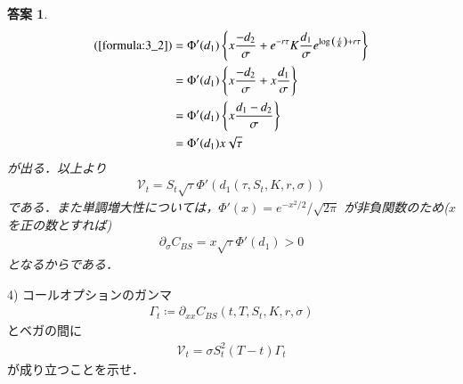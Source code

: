 \documentclass[11pt,a4paper]{jsarticle}
\theoremstyle{mystyle}
\newtheorem*{ans}{答案}
\begin{document}
\begin{ans}
\begin{align}
		(\refeq{formula:3_2}) &= 
		\Phi'(d_{1}) \left\{x\frac{-d_{2}}{\sigma} + e^{-r\tau}K\frac{d_{1}}{\sigma}e^{\log{\left(\frac{x}{K}\right)}+r\tau}\right\} \\
		&= \Phi'(d_{1}) \left\{x\frac{-d_{2}}{\sigma} + x\frac{d_{1}}{\sigma}\right\} \\
		&= \Phi'(d_{1}) \left\{x \frac{d_{1}-d_{2}}{\sigma}\right\} \\
		&= \Phi'(d_{1}) x \sqrt{\tau}
	\end{align}
	が出る．以上より
	\begin{align}
		\mathcal{V}_{t} = S_{t} \sqrt{\tau} \Phi'(d_{1}(\tau,S_{t},K,r,\sigma))
		\label{formula:3_4}
	\end{align}
	である．また単調増大性については，$\Phi'(x) = e^{-x^{2}/2}/\sqrt{2\pi}$
	が非負関数のため($x$を正の数とすれば)
	\begin{align}
		\partial_{\sigma}C_{BS} = x \sqrt{\tau} \Phi'(d_{1}) > 0
	\end{align}
	となるからである．
\end{ans}

\begin{itembox}[l]{4)}
	コールオプションのガンマ
	\begin{align}
		\Gamma_{t} \coloneqq \partial_{xx}C_{BS}(t,T,S_{t},K,r,\sigma)
	\end{align}
	とベガの間に
	\begin{align}
		\mathcal{V}_{t} = \sigma S_{t}^{2}(T-t)\Gamma_{t}
	\end{align}
	が成り立つことを示せ．
\end{itembox}
\end{document}
